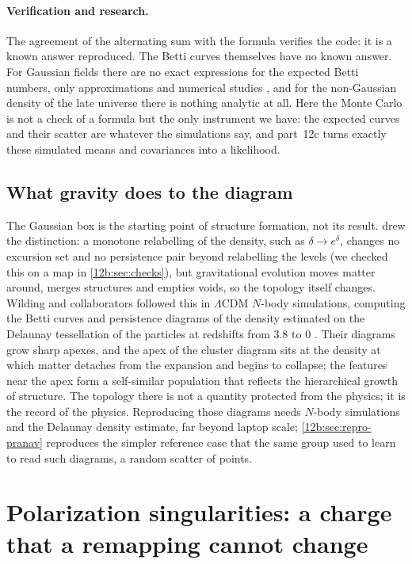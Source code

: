 \paragraph{Verification and research.} The agreement of the alternating sum with the formula verifies the code: it is
a known answer reproduced. The Betti curves themselves have no known answer. For Gaussian fields there are no exact
expressions for the expected Betti numbers, only approximations and numerical studies \cite{Pranav2017}, and for the
non-Gaussian density of the late universe there is nothing analytic at all. Here the Monte Carlo is not a check of
a formula but the only instrument we have: the expected curves and their scatter are whatever the simulations say,
and part~12c turns exactly these simulated means and covariances into a likelihood.

\subsection{What gravity does to the diagram}
\label{12b:sec:gravity}

The Gaussian box is the starting point of structure formation, not its result.  drew the
distinction: a monotone relabelling of the density, such as $\delta\to e^{\delta}$, changes no excursion set and no
persistence pair beyond relabelling the levels (we checked this on a map in \cref{12b:sec:checks}), but gravitational
evolution moves matter around, merges structures and empties voids, so the topology itself changes. Wilding and
collaborators followed this in $\Lambda$CDM $N$-body simulations, computing the Betti curves and persistence diagrams
of the density estimated on the Delaunay tessellation of the particles at redshifts from $3.8$ to $0$
\cite{Wilding2021}. Their diagrams grow sharp apexes, and the apex of the cluster diagram sits at the density at
which matter detaches from the expansion and begins to collapse; the features near the apex form a self-similar
population that reflects the hierarchical growth of structure. The topology there is not a quantity protected from
the physics; it is the record of the physics. Reproducing those diagrams needs $N$-body simulations and the Delaunay
density estimate, far beyond laptop scale; \cref{12b:sec:repro-pranav} reproduces the simpler reference case
that the same group used to learn to read such diagrams, a random scatter of points.
\section{Polarization singularities: a charge that a remapping cannot change}
\label{12b:sec:polsing}

